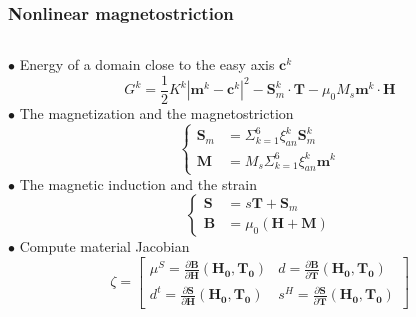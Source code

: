 \documentclass[compress]{beamer}
\begin{document}
\begin{frame}\frametitle{Nonlinear magnetostriction}
\begin{columns}[totalwidth=\textwidth] 
   \begin{column}{.65\textwidth}
$\bullet$ Energy of a domain close to the easy axis $\boldsymbol{c}^k$ \vspace*{-0.5\baselineskip}
\begin{equation*}
G^k=\frac{1}{2}K^k |\boldsymbol{m}^k-\boldsymbol{c}^k|^2-\boldsymbol{S}_m^k \cdot \boldsymbol{T} - \mu_0M_s\boldsymbol{m}^k\cdot\boldsymbol{H}
\end{equation*}
$\bullet$ The magnetization and the magnetostriction \vspace*{-0.75\baselineskip}
\begin{equation*}
	\left\{ 
	\begin{aligned}
	\boldsymbol{S}_m & = \Sigma_{k=1}^6 \xi_{an}^k \boldsymbol{S}_m^k   \\
	\boldsymbol{M} & = M_s\Sigma_{k=1}^6 \xi_{an}^k \boldsymbol{m}^k
	\end{aligned}
	\right.
\end{equation*}
$\bullet$ The magnetic induction and the strain \vspace*{-0.75\baselineskip}
\begin{equation*}
	\left\{ 
	\begin{aligned}
	\boldsymbol{S} & = s\boldsymbol{T}+\boldsymbol{S}_m   \\
	\boldsymbol{B} & = \mu_0(\boldsymbol{H}+\boldsymbol{M})
	\end{aligned}
	\right.
\end{equation*}
$\bullet$ Compute material Jacobian \vspace*{-0.75\baselineskip}
  \begin{equation*}
\zeta
=\begin{bmatrix}
      \mu^S = \frac{\partial \boldsymbol{B}}{\partial \boldsymbol{H}}(\boldsymbol{H_0},\boldsymbol{T_0})  & d = \frac{\partial \boldsymbol{B}}{\partial \boldsymbol{T}}(\boldsymbol{H_0},\boldsymbol{T_0})  \\[0.3em]
       d^t = \frac{\partial \boldsymbol{S}}{\partial \boldsymbol{H}}(\boldsymbol{H_0},\boldsymbol{T_0})  & s^H = \frac{\partial \boldsymbol{S}}{\partial \boldsymbol{T}}(\boldsymbol{H_0},\boldsymbol{T_0})

\end{bmatrix}
\end{equation*}
\end{column}
\end{columns}
\end{frame}
\end{document}

